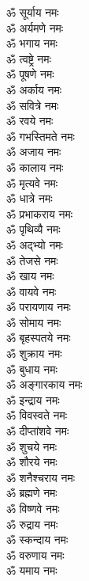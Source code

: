 \begin{multicols}{2}
    \begin{flushleft}
        ॐ सूर्याय नमः\\
        ॐ अर्यमणे नमः\\
        ॐ भगाय नमः\\
        ॐ त्वष्ट्रे नमः\\
        ॐ पूषणे नमः\\
        ॐ अर्काय नमः\\
        ॐ सवित्रे नमः\\
        ॐ रवये नमः\\
        ॐ गभस्तिमते नमः\\
        ॐ अजाय नमः\hfill{}\\
        ॐ कालाय नमः\\
        ॐ मृत्यवे नमः\\
        ॐ धात्रे नमः\\
        ॐ प्रभाकराय नमः\\
        ॐ पृथिव्यै नमः\\
        ॐ अद्भ्यो नमः\\
        ॐ तेजसे नमः\\
        ॐ खाय नमः\\
        ॐ वायवे नमः\\
        ॐ परायणाय नमः\hfill{}\\
        ॐ सोमाय नमः\\
        ॐ बृहस्पतये नमः\\
        ॐ शुक्राय नमः\\
        ॐ बुधाय नमः\\
        ॐ अङ्गारकाय नमः\\
        ॐ इन्द्राय नमः\\
        ॐ विवस्वते नमः\\
        ॐ दीप्तांशवे नमः\\
        ॐ शुचये नमः\\
        ॐ शौरये नमः\hfill{}\\
        ॐ शनैश्चराय नमः\\
        ॐ ब्रह्मणे नमः\\
        ॐ विष्णवे नमः\\
        ॐ रुद्राय नमः\\
        ॐ स्कन्दाय नमः\\
        ॐ वरुणाय नमः\\
        ॐ यमाय नमः\\

\end{flushleft}
\end{multicols}

